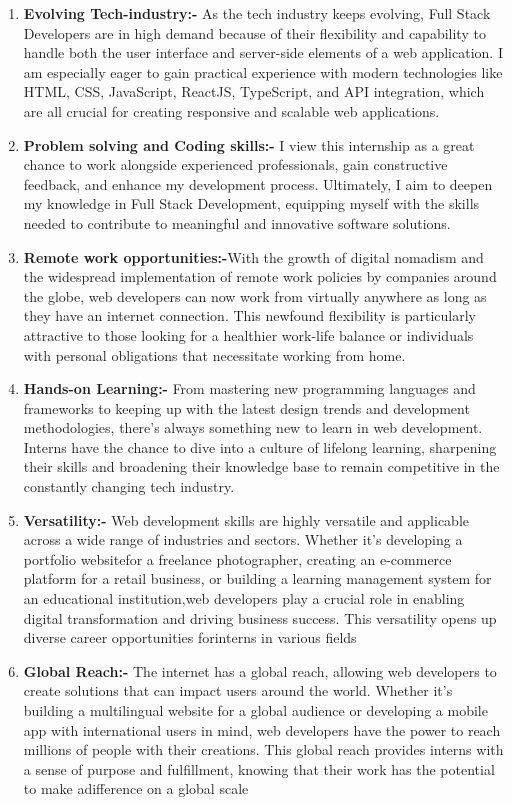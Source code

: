 \begin{enumerate}
\item \textbf{Evolving Tech-industry:-} 	As the tech industry keeps evolving, Full Stack Developers are in high demand because of their flexibility and capability to handle both the user interface and server-side elements of a web application. I am especially eager to gain practical experience with modern technologies like HTML, CSS, JavaScript, ReactJS, TypeScript, and API integration, which are all crucial for creating responsive and scalable web applications.\smallskip
\item \textbf{Problem solving and Coding skills:-} I view this internship as a great chance to work alongside experienced professionals, gain constructive feedback, and enhance my development process. Ultimately, I aim to deepen my knowledge in Full Stack Development, equipping myself with the skills needed to contribute to meaningful and innovative software solutions.\smallskip
\item \textbf{Remote work opportunities:-}With the growth of digital nomadism and the widespread implementation of remote work policies by companies around the globe, web developers can now work from virtually anywhere as long as they have an internet connection. This newfound flexibility is particularly attractive to those looking for a healthier work-life balance or individuals with personal obligations that necessitate working from home. \smallskip
\item \textbf{Hands-on Learning:-} From mastering new programming languages and frameworks to keeping up with the latest design trends and development methodologies, there’s always something new to learn in web development. Interns have the chance to dive into a culture of lifelong learning, sharpening their skills and broadening their knowledge base to remain competitive in the constantly changing tech industry.\smallskip
\item \textbf{Versatility:-} Web development skills are highly versatile and applicable across a wide range of industries and sectors. Whether it’s developing a portfolio websitefor a freelance photographer, creating an e-commerce platform for a retail business, or building a learning management system for an educational institution,web developers play a crucial role in enabling digital transformation and driving business success. This versatility opens up diverse career opportunities forinterns in various fields \smallskip
\item \textbf{Global Reach:-} The internet has a global reach, allowing web developers to create solutions that can impact users around the world. Whether it’s building a multilingual website for a global audience or developing a mobile app with international users in mind, web developers have the power to reach millions of people with their creations. This global reach provides interns with a sense of purpose and fulfillment, knowing that their work has the potential to make adifference on a global scale
\end{enumerate}